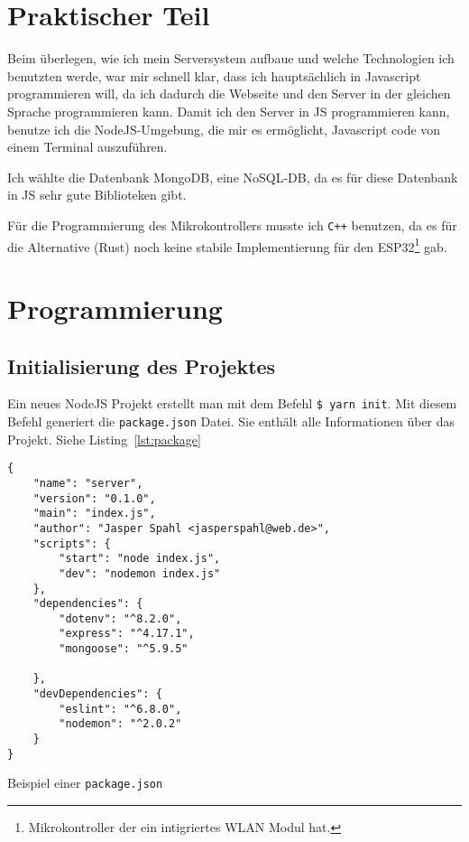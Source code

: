 \documentclass[a4paper, ngerman, 12pt]{scrartcl}
\begin{document}
\section{Praktischer Teil}

Beim überlegen, wie ich mein Serversystem aufbaue und welche Technologien ich benutzten werde, war mir schnell klar, dass ich hauptsächlich in Javascript programmieren will, da ich dadurch die Webseite und den Server in der gleichen Sprache programmieren kann.
Damit ich den Server in JS programmieren kann, benutze ich die NodeJS-Umgebung, die mir es ermöglicht, Javascript code von einem Terminal auszuführen.

Ich wählte die Datenbank MongoDB, eine NoSQL-DB, da es für diese Datenbank in JS sehr gute Biblioteken gibt.

Für die Programmierung des Mikrokontrollers musste ich \texttt{C++} benutzen, da es für die Alternative (Rust)
noch keine stabile Implementierung für den ESP32\footnote{Mikrokontroller der ein intigriertes WLAN Modul hat.} gab.

\section{Programmierung}

\subsection{Initialisierung des Projektes} %

Ein neues NodeJS Projekt erstellt man mit dem Befehl \texttt{\$ yarn init}.
Mit diesem Befehl generiert die \texttt{package.json} Datei.
Sie enthält alle Informationen über das Projekt. Siehe Listing~\ref{lst:package}


\begin{listing}[ht]
\centering
\begin{verbatim}
{
	"name": "server",
	"version": "0.1.0",
	"main": "index.js",
	"author": "Jasper Spahl <jasperspahl@web.de>",
	"scripts": {
		"start": "node index.js",
		"dev": "nodemon index.js"
	},
	"dependencies": {
		"dotenv": "^8.2.0",
		"express": "^4.17.1",
		"mongoose": "^5.9.5"

	},
	"devDependencies": {
		"eslint": "^6.8.0",
		"nodemon": "^2.0.2"
	}
}
\end{verbatim}
\caption{Beispiel einer \texttt{package.json}\label{lst:package}}
\end{listing}
\end{document}
